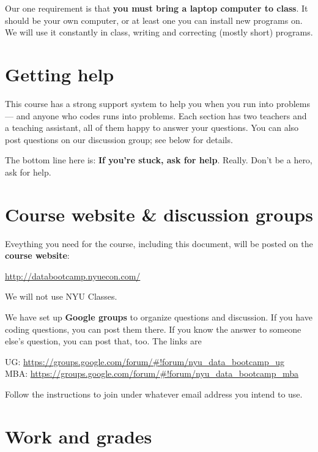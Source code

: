 \documentclass[11pt]{article}
\begin{document}
Our one requirement is that {\bf you must bring a laptop computer to class\/}.
It should be your own computer, or at least one you can install new programs on.
We will use it constantly in class, writing and correcting (mostly short) programs.


\section*{Getting help}



This course has a strong support system to help you when you run into problems ---
and anyone who codes runs into problems.
Each section has two teachers and a teaching assistant, all of them happy to answer your questions.
You  can also post questions on our discussion group; see below for details.

The bottom line here is:  {\bf If you're stuck, ask for help\/}.
Really.  Don't be a hero, ask for help.



\section*{Course website \& discussion groups}

Eveything you need for the course, including this document, will be posted on
the {\bf course website\/}:
%
\vspace{-0.15in}
\begin{center}
\url{http://databootcamp.nyuecon.com/}
\end{center}
\vspace{-0.15in}
%
We will not use NYU Classes.

We have set up {\bf Google groups\/} to organize questions and discussion.
If you have coding questions, you can post them there.
If you know the answer to someone else's question, you can post that, too.
The links are
%
\vspace{-0.1in}
\begin{center}
UG:   \url{https://groups.google.com/forum/#!forum/nyu_data_bootcamp_ug}  \\
MBA:  \url{https://groups.google.com/forum/#!forum/nyu_data_bootcamp_mba} 
\end{center}
\vspace{-0.1in}
%
Follow the instructions to join under whatever email address you intend to use.




\section*{Work and grades}
\end{document}
